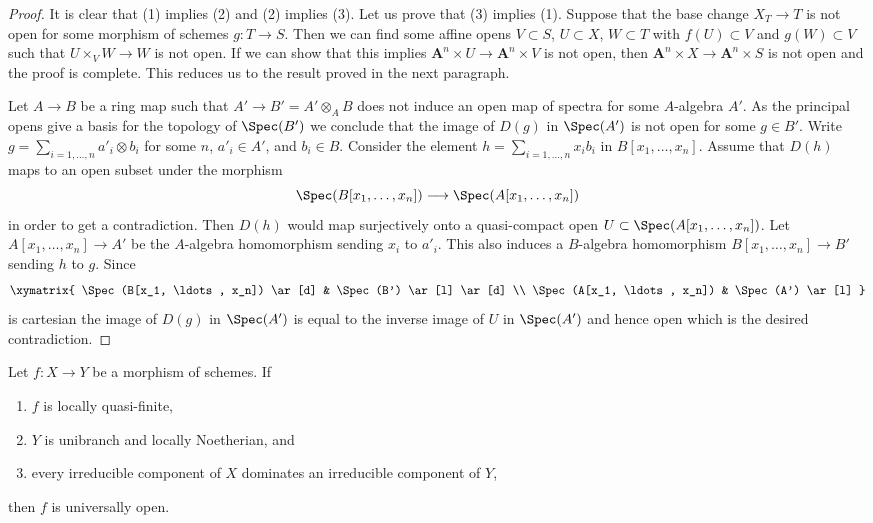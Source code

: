 \begin{proof}
It is clear that (1) implies (2) and (2) implies (3).
Let us prove that (3) implies (1).
Suppose that the base change $X_T \to T$ is not open
for some morphism of schemes $g : T \to S$.
Then we can find some affine opens
$V \subset S$, $U \subset X$, $W \subset T$
with $f(U) \subset V$ and $g(W) \subset V$
such that $U \times_V W \to W$ is not open.
If we can show that this implies
$\mathbf{A}^n \times U \to \mathbf{A}^n \times V$
is not open, then $\mathbf{A}^n \times X \to \mathbf{A}^n \times S$
is not open and the proof is complete. This reduces us
to the result proved in the next paragraph.

\medskip\noindent
Let $A \to B$ be a ring map such that $A' \to B' = A' \otimes_A B$
does not induce an open map of spectra for some $A$-algebra $A'$.
As the principal opens give a basis for the topology of $\Spec(B')$
we conclude that the image of $D(g)$ in $\Spec(A')$
is not open for some $g \in B'$. Write
$g = \sum_{i = 1, \ldots, n} a'_i \otimes b_i$
for some $n$, $a'_i \in A'$, and $b_i \in B$.
Consider the element $h = \sum_{i = 1, \ldots, n} x_i b_i$
in $B[x_1, \ldots, x_n]$. Assume that $D(h)$ maps to
an open subset under the morphism
$$
\Spec(B[x_1, \ldots, x_n]) \longrightarrow \Spec(A[x_1, \ldots, x_n])
$$
in order to get a contradiction. Then $D(h)$ would map surjectively
onto a quasi-compact open $U \subset \Spec(A[x_1, \ldots, x_n])$.
Let $A[x_1, \ldots, x_n] \to A'$ be the $A$-algebra homomorphism
sending $x_i$ to $a'_i$. This also induces a $B$-algebra
homomorphism $B[x_1, \ldots, x_n] \to B'$ sending $h$ to $g$.
Since
$$
\xymatrix{
\Spec(B[x_1, \ldots, x_n]) \ar[d] &
\Spec(B') \ar[l] \ar[d] \\
\Spec(A[x_1, \ldots, x_n]) &
\Spec(A') \ar[l]
}
$$
is cartesian the image of $D(g)$ in $\Spec(A')$ is equal to the
inverse image of $U$ in $\Spec(A')$ and hence open which is
the desired contradiction.
\end{proof}

\begin{lemma}
\label{lemma-quasi-finite-Noetherian-universally-open}
Let $f : X \to Y$ be a morphism of schemes. If
\begin{enumerate}
\item $f$ is locally quasi-finite,
\item $Y$ is unibranch and locally Noetherian, and
\item every irreducible component of $X$ dominates
an irreducible component of $Y$,
\end{enumerate}
then $f$ is universally open.
\end{lemma}

